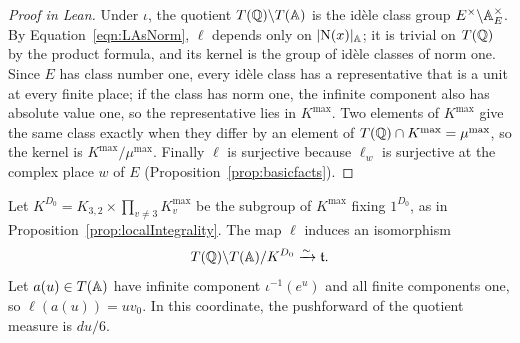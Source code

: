 \begin{proof}[Proof in Lean]

\leanok

Under $\iota$, the quotient $T(\QQ)\backslash T(\AA)$ is the id\`ele class group $E^\times\backslash\AA_E^\times$. By Equation~\ref{eqn:LAsNorm}, $\ell$ depends only on $|\mathrm N(x)|_\AA$; it is trivial on $T(\QQ)$ by the product formula, and its kernel is the group of id\`ele classes of norm one. Since $E$ has class number one, every id\`ele class has a representative that is a unit at every finite place; if the class has norm one, the infinite component also has absolute value one, so the representative lies in $K^{\mathrm{max}}$. Two elements of $K^{\mathrm{max}}$ give the same class exactly when they differ by an element of $T(\QQ)\cap K^{\mathrm{max}}=\mu^{\mathrm{max}}$, so the kernel is $K^{\mathrm{max}}/\mu^{\mathrm{max}}$. Finally $\ell$ is surjective because $\ell_w$ is surjective at the complex place $w$ of $E$ (Proposition~\ref{prop:basicfacts}).

\end{proof}

\begin{lemma}

\label{lemma:KprimeGroup}


\leanok



 Let $K^{D_0}=K_{3,2}\times\prod_{v\neq3}K_v^{\mathrm{max}}$ be the subgroup of $K^{\mathrm{max}}$ fixing $1^{D_0}$, as in Proposition~\ref{prop:localIntegrality}. The map $\ell$ induces an isomorphism \begin{equation*} T(\QQ)\backslash T(\AA)/K^{D_0} \xlongrightarrow{\sim} \mathfrak t. \end{equation*} Let $a(u)\in T(\AA)$ have infinite component $\iota^{-1}(e^u)$ and all finite components one, so $\ell(a(u))=uv_0$. In this coordinate, the pushforward of the quotient measure is $du/6$. 

\end{lemma}

